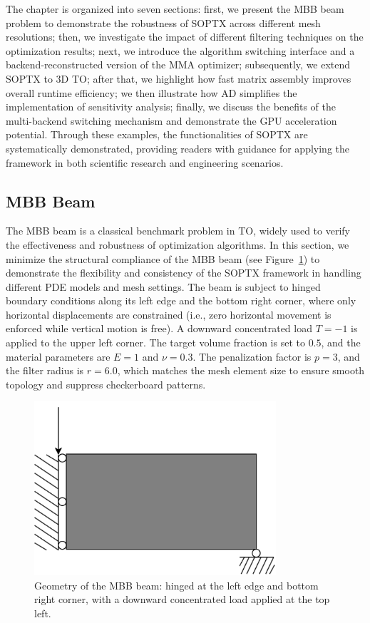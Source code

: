 \documentclass[mathpazo]{cicp}
\begin{document}
The chapter is organized into seven sections: first, we present the MBB beam problem to demonstrate the robustness of SOPTX across different mesh resolutions; then, we investigate the impact of different filtering techniques on the optimization results; next, we introduce the algorithm switching interface and a backend-reconstructed version of the MMA optimizer; subsequently, we extend SOPTX to 3D TO; after that, we highlight how fast matrix assembly improves overall runtime efficiency; we then illustrate how AD simplifies the implementation of sensitivity analysis; finally, we discuss the benefits of the multi-backend switching mechanism and demonstrate the GPU acceleration potential. Through these examples, the functionalities of SOPTX are systematically demonstrated, providing readers with guidance for applying the framework in both scientific research and engineering scenarios.

\subsection{MBB Beam}\label{sec:exp_mbb_beam}
The MBB beam is a classical benchmark problem in TO, widely used to verify the effectiveness and robustness of optimization algorithms. In this section, we minimize the structural compliance of the MBB beam (see Figure~\ref{fig:mbb_beam}) to demonstrate the flexibility and consistency of the SOPTX framework in handling different PDE models and mesh settings. The beam is subject to hinged boundary conditions along its left edge and the bottom right corner, where only horizontal displacements are constrained (i.e., zero horizontal movement is enforced while vertical motion is free). A downward concentrated load $T = -1$ is applied to the upper left corner. The target volume fraction is set to $0.5$, and the material parameters are $E = 1$ and $\nu = 0.3$. The penalization factor is $p = 3$, and the filter radius is $r = 6.0$, which matches the mesh element size to ensure smooth topology and suppress checkerboard patterns.
\begin{figure}[htp]
	\centering
	\includegraphics[width=0.8\textwidth]{figures/mbb_2d.png}
	\caption{Geometry of the MBB beam: hinged at the left edge and bottom right corner, with a downward concentrated load applied at the top left.}
	\label{fig:mbb_beam}
\end{figure}
\end{document}
